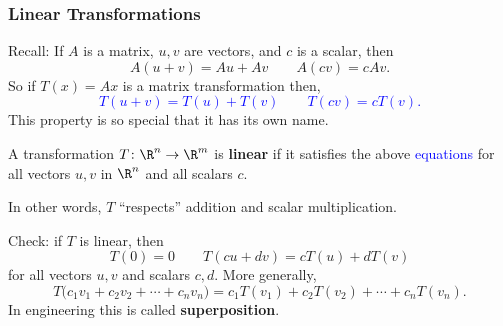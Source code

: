 \begin{frame}
\frametitle{Linear Transformations}

\displayskips{3pt}
\alert{Recall:} If $A$ is a matrix, $u,v$ are vectors, and $c$ is a scalar, then
\[ A(u+v) = Au + Av \qquad A(cv) = cAv. \]
\pause
So if $T(x) = Ax$ is a matrix transformation then,
\textcolor<4->{blue}{
\[ T(u+v) = T(u) + T(v)  \qquad  T(cv) = cT(v). \]}%
\pause
This property is so special that it has its own name.

\pause\smallskip
\begin{defn}
  A transformation $T\colon\R^n\to\R^m$ is \textbf{linear} if it satisfies the
  above \textcolor{blue}{equations} for all vectors $u,v$ in $\R^n$ and all
  scalars $c$.
\end{defn}

\pause
In other words, $T$ ``respects'' addition and scalar multiplication.

\pause\bigskip
\alert{Check:} if $T$ is linear, then
\[ T(0) = 0 \qquad T(cu + dv) = cT(u) + dT(v) \]
for all vectors $u,v$ and scalars $c,d$.
\pause
More generally,
\[ T\bigl( c_1v_1 + c_2v_2 + \cdots + c_nv_n \bigr)
 = c_1 T(v_1) + c_2 T(v_2) + \cdots + c_n T(v_n). \]
\pause
In engineering this is called \textbf{superposition}.

\end{frame}



